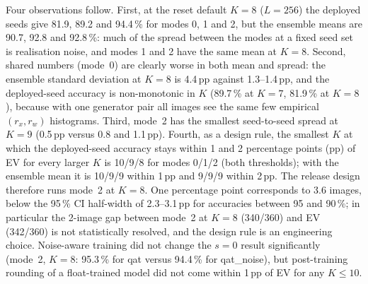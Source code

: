 \documentclass[conference]{IEEEtran}
\begin{document}
Four observations follow. First, at the reset default $K=8$ ($L=256$) the
deployed seeds give 81.9, 89.2 and 94.4\,\% for modes 0, 1 and 2, but the
ensemble means are 90.7, 92.8 and 92.8\,\%: much of the spread between the
modes at a fixed seed set is realisation noise, and modes 1 and 2 have the
same mean at $K=8$. Second, shared numbers (mode~0) are clearly worse in both
mean and spread: the ensemble standard deviation at $K=8$ is 4.4\,pp against
1.3--1.4\,pp, and the deployed-seed accuracy is non-monotonic in $K$
(89.7\,\% at $K=7$, 81.9\,\% at $K=8$), because with one generator pair all
images see the same few empirical $(r_x,r_w)$ histograms. Third, mode~2
has the smallest seed-to-seed spread at $K=9$ (0.5\,pp versus 0.8 and
1.1\,pp).
Fourth, as a design rule, the smallest $K$ at which the deployed-seed accuracy
stays within 1 and 2 percentage points (pp) of EV for every larger $K$ is
10/9/8 for modes 0/1/2 (both thresholds); with the ensemble mean it is 10/9/9
within 1\,pp and 9/9/9 within 2\,pp. The release design therefore runs mode~2
at $K=8$.
One percentage point corresponds to 3.6 images, below the 95\,\% CI
half-width of 2.3--3.1\,pp for accuracies between 95 and 90\,\%; in particular
the 2-image gap between mode~2 at $K=8$ (340/360) and EV (342/360) is not
statistically resolved, and the design rule is an engineering choice.
Noise-aware training did not change the $s=0$ result significantly (mode~2,
$K=8$: 95.3\,\% for qat versus 94.4\,\% for qat\_noise), but post-training
rounding of a float-trained model did not come within 1\,pp of EV for any
$K\le10$.
\end{document}
